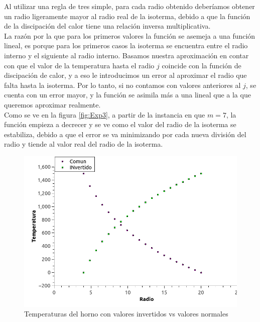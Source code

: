Al utilizar una regla de tres simple, para cada radio obtenido deberíamos obtener un radio ligeramente mayor al radio real de la isoterma, debido a que la función de la discipación del calor tiene una relación inversa multiplicativa.\\
La razón por la que para los primeros valores la función se asemeja a una función lineal, es porque para los primeros casos la isoterma se encuentra entre el radio interno y el siguiente al radio interno. Basamos nuestra aproximación en contar con que el valor de la temperatura hasta el radio $j$ coincide con la función de discipación de calor, y a eso le introducimos un error al aproximar el radio que falta hasta la isoterma. Por lo tanto, si no contamos con valores anteriores al $j$, se cuenta con un error mayor, y la función se asimila más a una lineal que a la que queremos aproximar realmente.\\
Como se ve en la figura \ref{fig:Exp3}, a partir de la instancia en que $m=7$, la función empieza a decrecer y se ve como el valor del radio de la isoterma se estabiliza, debido a que el error se va minimizando por cada nueva división del radio y tiende al valor real del radio de la isoterma. \\

\begin{figure}
  \vspace{-20pt}
  \begin{center}
    \includegraphics[scale=0.4]{imagenes/temperaturasInvertidoAmbos.png}
  \end{center}
  \vspace{-20pt}
  \caption{Temperaturas del horno con valores invertidos vs valores normales}
  \vspace{-10pt}
  \label{fig:aproximacion}
\end{figure}

